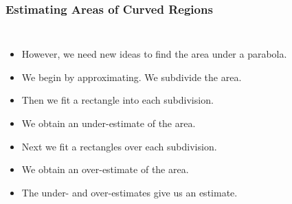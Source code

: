 \documentclass[serif,ignorenonframetext]{beamer}
\begin{document}
\begin{frame}
  \frametitle{Estimating Areas of Curved Regions}
  \begin{columns}
  \begin{itemize}[<+->]
  \item However, we need new ideas to find the area under a parabola.
  \item We begin by approximating.  We subdivide the area.
  \item Then we fit a rectangle into each subdivision.
  \item We obtain an under-estimate of the area.
  \item Next we fit a rectangles over each subdivision.
  \item We obtain an over-estimate of the area.
  \item The under- and over-estimates give us an estimate.
  \end{itemize}

\end{columns}
\end{frame}
\end{document}
